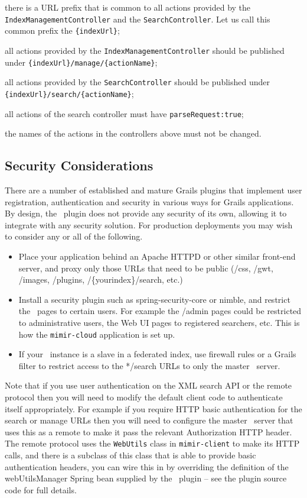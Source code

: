 \bit
\item there is a URL prefix that is common to all actions provided by the
  {\tt IndexManagementController} and the {\tt SearchController}. Let us call
  this common prefix the {\tt \{indexUrl\}};
\item all actions provided by the {\tt IndexManagementController} should be
  published under {\tt \{indexUrl\}/manage/\{actionName\}};
\item all actions provided by the {\tt SearchController} should be
  published under {\tt \{indexUrl\}/search/\{actionName\}};
\item all actions of the search controller must have {\tt parseRequest:true}; 
\item the names of the actions in the controllers above must not be changed.
\eit 

\subsection{Security Considerations}

There are a number of established and mature Grails plugins that implement user
registration, authentication and security in various ways for Grails
applications.  By design, the \Mimir\ plugin does not provide any
security of its own, allowing it to integrate with any security solution. For
production deployments you may wish to consider any or all of the following.

\begin{itemize}
\item Place your application behind an Apache HTTPD or other similar front-end
  server, and proxy only those URLs that need to be public (/css, /gwt,
  /images, /plugins, /\{yourindex\}/search, etc.)
\item Install a security plugin such as spring-security-core or nimble, and
  restrict the \Mimir\ pages to certain users.  For example the /admin pages
  could be restricted to administrative users, the Web UI pages to registered
  searchers, etc.  This is how the {\tt mimir-cloud} application is set up.
\item If your \Mimir\ instance is a slave in a federated index, use firewall
  rules or a Grails filter to restrict access to the */search URLs to only the
  master \Mimir\ server.
\end{itemize}

Note that if you use user authentication on the XML search API or the remote
protocol then you will need to modify the default client code to authenticate
itself appropriately.  For example if you require HTTP basic authentication for
the search or manage URLs then you will need to configure the master \Mimir\
server that uses this as a remote to make it pass the relevant Authorization
HTTP header.  The remote protocol uses the {\tt WebUtils} class in
{\tt mimir-client} to make its HTTP calls, and there is a subclass of this
class that is able to provide basic authentication headers, you can wire this
in by overriding the definition of the webUtilsManager Spring bean supplied by
the \Mimir\ plugin -- see the plugin source code for full details.

